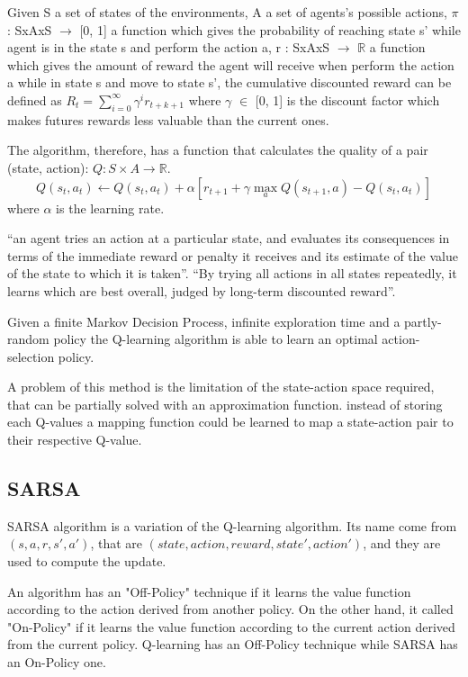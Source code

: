 Given S a set of states of the environments, A a set of agents's possible actions,
$\pi$ : SxAxS $\rightarrow$ [0, 1] a function which gives the probability of reaching state s' while agent is in the state s and perform the action a,
r : SxAxS $\rightarrow$ $\mathbb{R}$ a function which gives the amount of reward the agent will receive when perform the action a while in state s and move to state s',
the cumulative discounted reward can be defined as $R_t = \sum_{i=0}^{\infty} \gamma^i r_{t+k+1}$
where $\gamma$ $\in$ [0, 1] is the discount factor which makes futures rewards less valuable than the current ones.

The algorithm, therefore, has a function that calculates the quality of a pair (state, action): $Q:S\times A\to {\mathbb  {R}}$.
\begin{equation*}
    Q(s_t, a_t) \leftarrow Q(s_t, a_t) + \alpha [r_{t+1} + \gamma \max_a Q(s_{t+1}, a) - Q(s_t, a_t)] 
\end{equation*}
where $\alpha$ is the learning rate.

``an agent tries an action at a particular state, and evaluates its consequences in terms of the immediate reward or penalty
it receives and its estimate of the value of the state to which it is taken''\cite{watkins1992q}.
``By trying all actions in all states repeatedly, it learns which are best overall, judged by long-term discounted reward''\cite{watkins1992q}.

Given a finite Markov Decision Process, infinite exploration time and a partly-random policy
the Q-learning algorithm is able to learn an optimal action-selection policy.

A problem of this method is the limitation of the state-action space required, that can be partially solved with an approximation function.
instead of storing each Q-values a mapping function could be learned to map a state-action pair to their respective Q-value.

\subsection{SARSA}
SARSA algorithm \cite{qiang2011reinforcement} is a variation of the Q-learning algorithm.
Its name come from $(s, a, r, s', a')$, that are $(state, action, reward, state', action')$, and they are used to compute the update.

An algorithm has an "Off-Policy" technique if it learns the value function according to the action derived from another policy. On the other hand, it called "On-Policy" if it learns the value function according to the current action derived from the current policy.
Q-learning has an Off-Policy technique while SARSA has an On-Policy one.

